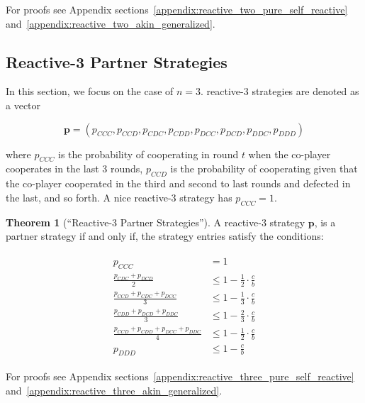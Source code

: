 \documentclass[11pt]{article}
\theoremstyle{definition}
\newtheorem{theorem}{Theorem}[section]
\begin{document}
For proofs see Appendix sections~\ref{appendix:reactive_two_pure_self_reactive}
and~\ref{appendix:reactive_two_akin_generalized}.


\subsection{Reactive-3 Partner Strategies}\label{section:reactive_three_partner_strategies}

In this section, we focus on the case of $n=3$. reactive-3 strategies are
denoted as a vector 

$$\mathbf{p}=(p_{CCC}, p_{CCD}, p_{CDC}, p_{CDD}, p_{DCC}, p_{DCD}, p_{DDC}, p_{DDD})$$

where $p_{CCC}$ is the probability of cooperating in round $t$ when the
co-player cooperates in the last 3 rounds, $p_{CCD}$ is the probability of
cooperating given that the co-player cooperated in the third and second to last
rounds and defected in the last, and so forth. A nice reactive-3 strategy
has $p_{CCC} = 1$.

\begin{theorem}[``Reactive-3 Partner Strategies'']\label{theorem:reactive_three_partner_strategies}
A reactive-3 strategy $\mathbf{p}$, is a partner strategy if and only if,
the strategy entries satisfy the conditions:

\begin{align}\label{eq:three_bit_conditions}
  \begin{split}
  p_{CCC} & = 1 \\
  \frac{p_{CDC} + p_{DCD}}{2} & \leq 1 - \frac{1}{2} \cdot \frac{c}{b} \\
  \frac{p_{CCD} + p_{CDC} + p_{DCC}}{3} & \leq 1 - \frac{1}{3} \cdot \frac{c}{b} \\
  \frac{p_{CDD} + p_{DCD} + p_{DDC}}{3} & \leq 1 - \frac{2}{3} \cdot \frac{c}{b} \\
  \frac{p_{CCD} + p_{CDD} + p_{DCC} + p_{DDC}}{4}  & \leq 1 - \frac{1}{2} \cdot \frac{c}{b}  \\
  p_{DDD} & \leq 1\!-\! \frac{c}{b}
  \end{split}
\end{align}
\end{theorem}

For proofs see Appendix sections~\ref{appendix:reactive_three_pure_self_reactive}
and~\ref{appendix:reactive_three_akin_generalized}.

\end{document}

